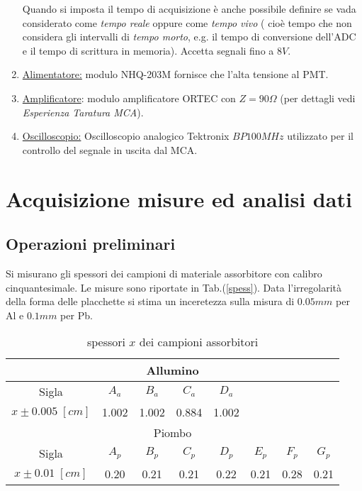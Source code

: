 \documentclass[12pt,a4paper,openright,twoside]{article}
\numberwithin{equation}{section} %
\begin{document}
\begin{enumerate}
Quando si imposta il tempo di acquisizione è anche possibile definire se vada considerato come \textit{tempo reale} oppure come \textit{tempo vivo} ( cioè tempo che non considera gli intervalli di \textit{tempo morto}, e.g. il tempo di conversione dell'ADC e il tempo di scrittura in memoria).
Accetta segnali fino a $8V$.

\item \underline{Alimentatore:} modulo NHQ-203M fornisce che l'alta tensione al PMT.
\item \underline{Amplificatore}: modulo amplificatore ORTEC con $Z=90 \Omega $ (per dettagli vedi \textit{Esperienza Taratura MCA}).
\item \underline{Oscilloscopio:} Oscilloscopio analogico Tektronix $BP 100 MHz$ utilizzato per il controllo del segnale in uscita dal MCA.
\end{enumerate}

\section{Acquisizione misure ed analisi dati}
\subsection{Operazioni preliminari}
Si misurano gli spessori dei campioni di materiale assorbitore con calibro cinquantesimale. Le misure sono riportate in Tab.(\eqref{spess}). Data l'irregolarità della forma delle placchette si stima un inceretezza sulla misura di $0.05mm$ per Al e $0.1mm$ per Pb.

\begin{table}[]
\centering

\begin{tabular}{|c|c|c|c|c|c|c|c|}
\hline
\multicolumn{8}{|c|}{Allumino}                                         \\ \hline
Sigla             & $A_a$     &$ B_a$     & $C_a $    & $D_a$     &      &      &      \\ \hline
$x\pm 0.005 \;[cm]$ & 1.002 & 1.002 & 0.884 & 1.002 &      &      &      \\ \hline
\multicolumn{8}{|c|}{Piombo}                                           \\ \hline
Sigla             &$ A_p$     & $B_p $    & $C_p$     & $D_p $    & $E_p   $ & $F_p  $  & $G_p $   \\ \hline
$x\pm 0.01 \; [cm]$  & 0.20  & 0.21  & 0.21  & 0.22  & 0.21 & 0.28 & 0.21 \\ \hline

\end{tabular}
\caption{ spessori $x$ dei campioni assorbitori}
\label{spess}
\end{table}
\end{document}
